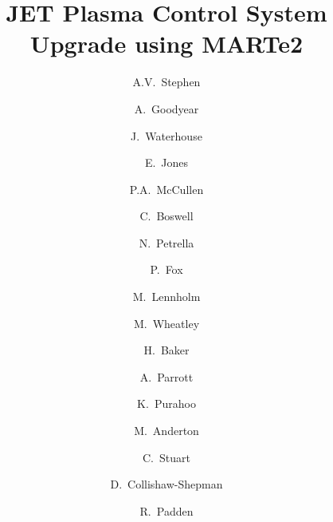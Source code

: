 \documentclass[preprint]{elsarticle}
\begin{document}
\begin{frontmatter}



\title{JET Plasma Control System Upgrade using MARTe2}


	\author[UKAEA]{A.V.~Stephen} %
\author[UKAEA]{A.~Goodyear}
\author[UKAEA]{J.~Waterhouse}
\author[UKAEA]{E.~Jones}
\author[UKAEA]{P.A.~McCullen}
\author[UKAEA]{C.~Boswell}
\author[UKAEA]{N.~Petrella}
\author[UKAEA]{P.~Fox}
\author[UKAEA]{M.~Lennholm}
\author[UKAEA]{M.~Wheatley}
\author[UKAEA]{H.~Baker}
\author[UKAEA]{A.~Parrott}
\author[UKAEA]{K.~Purahoo}
\author[UKAEA]{M.~Anderton}
\author[UKAEA]{C.~Stuart}
\author[UKAEA]{D.~Collishaw-Shepman}
\author[UKAEA]{R.~Padden}



\end{frontmatter}
\end{document}
